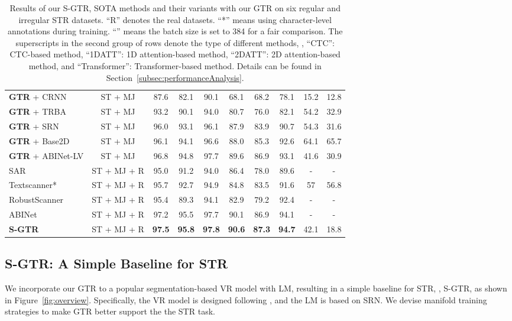 \documentclass[letterpaper]{article} \usepackage{aaai22}  \usepackage{times}  \usepackage{helvet}  \usepackage{courier}  \usepackage[hyphens]{url}  \usepackage{graphicx} \urlstyle{rm} \def\UrlFont{\rm}  \usepackage{natbib}  \usepackage{caption} \DeclareCaptionStyle{ruled}{labelfont=normalfont,labelsep=colon,strut=off} \frenchspacing  \setlength{\pdfpagewidth}{8.5in}  \setlength{\pdfpageheight}{11in}
\newcommand{\bt}{\color{black}}
\begin{document}
\begin{table*}[t]
\begin{tabular}{l|c|c|c|c|c|c|c|c|c}
		\textbf{GTR} + CRNN &ST + MJ  & 87.6 & 82.1 & 90.1& 68.1 & 68.2 & 78.1 &15.2 &12.8\\
		\textbf{GTR} + TRBA &ST + MJ  & 93.2 & 90.1 & 94.0& 80.7 & 76.0 & 82.1 & 54.2 & 32.9\\
		\textbf{GTR} + SRN &ST + MJ   & 96.0 & 93.1 & 96.1 & 87.9 & 83.9 & 90.7 &54.3 &31.6\\
		\textbf{GTR} + Base2D  &ST + MJ  & 96.1 & 94.1 & 96.6 & 88.0 & 85.3 & 92.6& 64.1 & 65.7\\
\bt \textbf{GTR} + ABINet-LV &ST + MJ & 96.8   & 94.8  & 97.7  & 89.6   & 86.9  & 93.1
        & 41.6 & 30.9 \\
		\hline 
		SAR\cite{li2019show}& ST + MJ + R & 95.0 & 91.2 & 94.0 & 86.4 & 78.0 & 89.6 &- &-\\
		Textscanner* \cite{wan2020textscanner}  & ST + MJ + R & 95.7 & 92.7 & 94.9 & 84.8 & 83.5 & 91.6 & 57&56.8\\ 
		RobustScanner \cite{yue2020robustscanner} &ST + MJ + R &95.4&89.3&94.1& 82.9&79.2&92.4 &- &-\\
		ABINet \cite{fang2021read} &ST + MJ + R  &97.2	&95.5 &97.7	&90.1 &86.9	&94.1 & -&-\\ 
\bf{S-GTR}    &ST + MJ + R  &\bf{97.5}	&\bf{95.8}	&\bf{97.8}	&\bf{90.6}	&\bf{87.3}	&\bf{94.7} &42.1 &18.8 \\ 
		\hline
	\end{tabular}
	\caption{Results of our S-GTR, SOTA methods and their variants with our GTR on six regular and irregular STR datasets. ``R'' denotes the real datasets. ``*'' means using character-level annotations during training. {\bt ``\dag'' means the batch size is set to 384 for a fair comparison.} The superscripts in the second group of rows denote the type of different methods, , ``CTC'': CTC-based method, ``1DATT'': 1D attention-based method, ``2DATT'': 2D attention-based method, and ``Transformer'': Transformer-based method. Details can be found in Section~\ref{subsec:performanceAnalysis}.}
	\label{tab:main}
\end{table*}




\subsection{S-GTR: A Simple Baseline for STR}



We incorporate our GTR to a popular segmentation-based VR model with LM, resulting in a simple baseline for STR, , S-GTR, as shown in Figure~\ref{fig:overview}. 
{\bt Specifically, the VR model is designed following \cite{wan2020vocabulary}, and the LM is based on SRN.}
We devise manifold training strategies to make GTR better support the the STR task.
\end{document}
